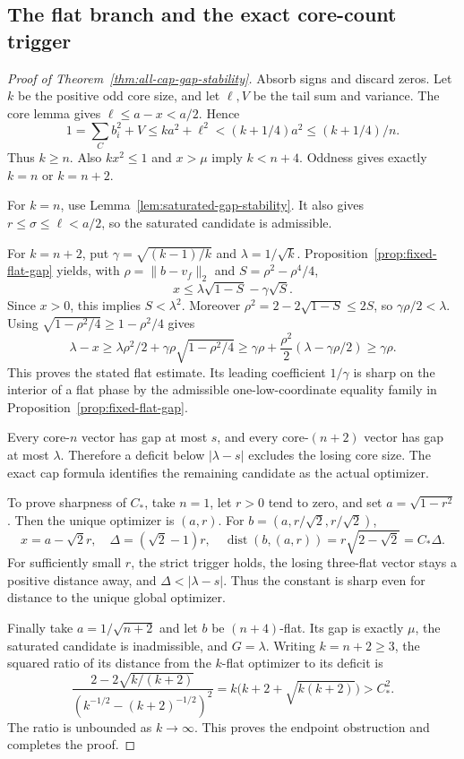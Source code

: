 \documentclass[11pt]{article}
\theoremstyle{remark}\newtheorem{remark}[theorem]{Remark}
\begin{document}
\subsection{The flat branch and the exact core-count trigger}

\begin{proof}[Proof of Theorem~\ref{thm:all-cap-gap-stability}]
Absorb signs and discard zeros. Let $k$ be the positive odd core size,
and let $\ell,V$ be the tail sum and variance. The core lemma gives
$\ell\le a-x<a/2$. Hence
\[
 1=\sum_C b_i^2+V\le ka^2+\ell^2<(k+1/4)a^2\le(k+1/4)/n.
\]
Thus $k\ge n$. Also $kx^2\le1$ and $x>\mu$ imply $k<n+4$.
Oddness gives exactly $k=n$ or $k=n+2$.

For $k=n$, use Lemma~\ref{lem:saturated-gap-stability}. It also gives
$r\le\sigma\le\ell<a/2$, so the saturated candidate is admissible.

For $k=n+2$, put $\gamma=\sqrt{(k-1)/k}$ and $\lambda=1/\sqrt{k}$.
Proposition~\ref{prop:fixed-flat-gap} yields, with
$\rho=\|b-v_f\|_2$ and $S=\rho^2-\rho^4/4$,
\[
 x\le\lambda\sqrt{1-S}-\gamma\sqrt S.
\]
Since $x>0$, this implies $S<\lambda^2$. Moreover
$\rho^2=2-2\sqrt{1-S}\le2S$, so $\gamma\rho/2<\lambda$.
Using $\sqrt{1-\rho^2/4}\ge1-\rho^2/4$ gives
\[
 \lambda-x\ge\lambda\rho^2/2+\gamma\rho\sqrt{1-\rho^2/4}
 \ge\gamma\rho+\frac{\rho^2}{2}(\lambda-\gamma\rho/2)
 \ge\gamma\rho.
\]
This proves the stated flat estimate. Its leading coefficient $1/\gamma$ is sharp on the interior of a
flat phase by the admissible one-low-coordinate equality family in
Proposition~\ref{prop:fixed-flat-gap}.

Every core-$n$ vector has gap at most $s$, and every core-$(n+2)$ vector
has gap at most $\lambda$. Therefore a deficit below $|\lambda-s|$
excludes the losing core size. The exact cap formula identifies the
remaining candidate as the actual optimizer.

To prove sharpness of $C_*$, take $n=1$, let $r>0$ tend to zero, and set
$a=\sqrt{1-r^2}$. Then the unique optimizer is $(a,r)$.
For $b=(a,r/\sqrt2,r/\sqrt2)$,
\[
 x=a-\sqrt2r,\quad \Delta=(\sqrt2-1)r,
 \quad\operatorname{dist}(b,(a,r))=r\sqrt{2-\sqrt2}=C_*\Delta.
\]
For sufficiently small $r$, the strict trigger holds, the losing
three-flat vector stays a positive distance away, and
$\Delta<|\lambda-s|$. Thus the constant is sharp even for distance to
the unique global optimizer.

Finally take $a=1/\sqrt{n+2}$ and let $b$ be $(n+4)$-flat. Its gap is
exactly $\mu$, the saturated candidate is inadmissible, and $G=\lambda$.
Writing $k=n+2\ge3$, the squared ratio of its distance from the $k$-flat
optimizer to its deficit is
\[
 \frac{2-2\sqrt{k/(k+2)}}{(k^{-1/2}-(k+2)^{-1/2})^2}
 =k\bigl(k+2+\sqrt{k(k+2)}\bigr)>C_*^2.
\]
The ratio is unbounded as $k\to\infty$. This proves the endpoint
obstruction and completes the proof.
\end{proof}
\end{document}
